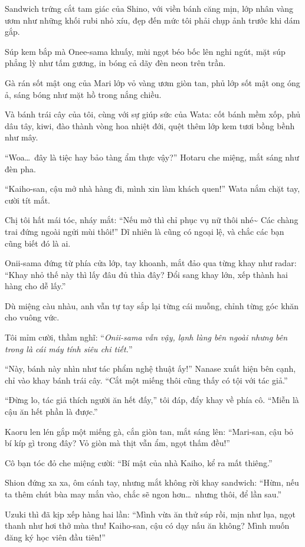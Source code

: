 \documentclass[../main.tex]{subfiles}
\begin{document}
Sandwich trứng cắt tam giác của Shino, với viền bánh căng mịn, lớp nhân vàng ươm như những khối rubi nhỏ xíu, đẹp đến mức tôi phải chụp ảnh trước khi dám gắp.

Súp kem bắp mà Onee-sama khuấy, mùi ngọt béo bốc lên nghi ngút, mặt súp phẳng lỳ như tấm gương, in bóng cả dãy đèn neon trên trần.

Gà rán sốt mật ong của Mari lớp vỏ vàng ươm giòn tan, phủ lớp sốt mật ong óng ả, sáng bóng như mặt hồ trong nắng chiều.

Và bánh trái cây của tôi, cùng với sự giúp sức của Wata: cốt bánh mềm xốp, phủ dâu tây, kiwi, đào thành vòng hoa nhiệt đới, quệt thêm lớp kem tươi bồng bềnh như mây.

``Woa\dots\ đây là tiệc hay bảo tàng ẩm thực vậy?'' Hotaru che miệng, mắt sáng như đèn pha.

``Kaiho-san, cậu mở nhà hàng đi, mình xin làm khách quen!'' Wata nắm chặt tay, cười tít mắt.

Chị tôi hất mái tóc, nháy mắt: ``Nếu mở thì chỉ phục vụ nữ thôi nhé\~{} Các chàng trai đứng ngoài ngửi mùi thôi!'' Dĩ nhiên là cũng có ngoại lệ, và chắc các bạn cũng biết đó là ai.

Onii-sama đứng từ phía cửa lớp, tay khoanh, mắt đảo qua từng khay như radar: ``Khay nhỏ thế này thì lấy đâu đủ thìa đây? Đổi sang khay lớn, xếp thành hai hàng cho dễ lấy.''

Dù miệng càu nhàu, anh vẫn tự tay sắp lại từng cái muỗng, chỉnh từng góc khăn cho vuông vức.

Tôi mỉm cười, thầm nghĩ: ``\textit{Onii-sama vẫn vậy, lạnh lùng bên ngoài nhưng bên trong là cái máy tính siêu chi tiết.}''

``Này, bánh này nhìn như tác phẩm nghệ thuật ấy!''  Nanase xuất hiện bên cạnh, chỉ vào khay bánh trái cây. ``Cắt một miếng thôi cũng thấy có tội với tác giả.''

``Đừng lo, tác giả thích người ăn hết đấy,'' tôi đáp, đẩy khay về phía cô. ``Miễn là cậu ăn hết phần là được.''

Kaoru len lén gắp một miếng gà, cắn giòn tan, mắt sáng lên: ``Mari-san, cậu bỏ bí kíp gì trong đây? Vỏ giòn mà thịt vẫn ẩm, ngọt thấm đều!''

Cô bạn tóc đỏ che miệng cười: ``Bí mật của nhà Kaiho, kể ra mất thiêng.''

Shion đứng xa xa, ôm cánh tay, nhưng mắt không rời khay sandwich: ``Hừm, nếu ta thêm chút bùa may mắn vào, chắc sẽ ngon hơn\dots\ nhưng thôi, để lần sau.''

Uzuki thì đã kịp xếp hàng hai lần: ``Mình vừa ăn thử súp rồi, mịn như lụa, ngọt thanh như hơi thở mùa thu! Kaiho-san, cậu có dạy nấu ăn không? Mình muốn đăng ký học viên đầu tiên!''
\end{document}
